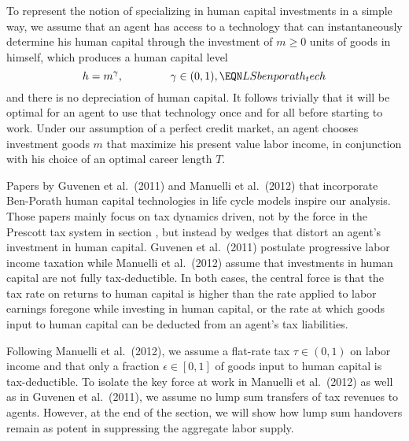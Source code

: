 To represent the notion of specializing in human capital
investments in a simple way, we assume
that an agent has access to a technology
that can instantaneously determine his human capital through
the investment of $m\geq 0$ units of goods in himself, which
produces a human capital level
$$
h = m^{\gamma},   \hskip1.5cm \gamma\in(0,1),   \EQN LSbenporath_tech
$$
and there is no depreciation of human capital.
It follows trivially that it will be optimal for an agent to
use that technology once and for all before starting to work.
Under our assumption of a perfect credit market, an agent
chooses investment goods $m$ that maximize his present
value labor income, in conjunction with his choice of an
optimal career length $T$.

Papers  by Guvenen et al.\ (2011) and Manuelli et al.\ (2012)
that incorporate  Ben-Porath human capital
technologies in life cycle models inspire our analysis. Those papers
mainly focus on  tax dynamics driven,  not by the force in the Prescott tax
system in section , but instead by wedges that distort
an agent's investment in human capital.
Guvenen et al.\ (2011) postulate progressive labor income taxation
while Manuelli et al.\ (2012) assume that investments in human
capital are not fully tax-deductible. In both cases, the central
force is that the tax rate on returns to human capital is higher
than the rate applied to  labor earnings foregone while
investing in human capital, or the rate at which goods input
to human capital can be deducted from an agent's tax liabilities.

Following Manuelli et al.\ (2012), we assume a flat-rate tax
$\tau \in (0,1)$ on labor income and that only a fraction
$\epsilon \in [0,1]$ of goods input to human capital is
tax-deductible. To isolate the key force at work in Manuelli et al.\ (2012)
as well as in Guvenen et al.\ (2011), we assume no lump sum
transfers of tax revenues to agents. However, at the end of the
section, we will show how lump
sum handovers remain as potent in suppressing the aggregate
labor supply. %


